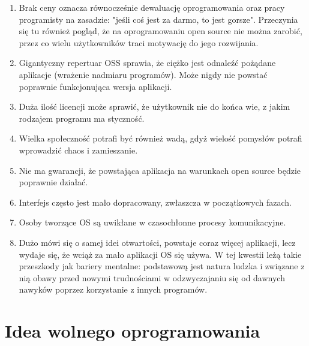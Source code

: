\documentclass{article}
\begin{document}
\begin{enumerate}
    \item Brak ceny oznacza równocześnie dewaluację oprogramowania oraz pracy programisty na zasadzie: "jeśli coś jest za darmo, to jest gorsze". Przeczynia się tu również pogląd, że na oprogramowaniu open source nie można zarobić, przez co wielu użytkowników traci motywację do jego rozwijania\cite{Kotula}.
    
    \item Gigantyczny repertuar OSS sprawia, że ciężko jest odnaleźć pożądane aplikacje (wrażenie nadmiaru programów). Może nigdy nie powstać poprawnie funkcjonująca wersja aplikacji\cite{Kotula}.
    
    \item Duża ilość licencji może sprawić, że użytkownik nie do końca wie, z jakim rodzajem programu ma styczność\cite{Kotula}.
    
    \item Wielka społeczność potrafi być również wadą, gdyż wielość pomysłów potrafi wprowadzić chaos i zamieszanie\cite{Kotula}.
    
    \item Nie ma gwarancji, że powstająca aplikacja na warunkach open source będzie poprawnie działać\cite{Kotula}.
    
    \item Interfejs często jest mało dopracowany, zwłaszcza w początkowych fazach\cite{Kotula}.
    
    \item Osoby tworzące OS są uwikłane w czasochłonne procesy komunikacyjne\cite{Kotula}.
    
    \item Dużo mówi się o samej idei otwartości, powstaje coraz więcej aplikacji, lecz wydaje się, że wciąż za mało aplikacji OS się używa. W tej kwestii leżą takie przeszkody jak bariery mentalne: podstawową jest natura ludzka i związane z nią obawy przed nowymi trudnościami w odzwyczajaniu się od dawnych nawyków poprzez korzystanie z innych programów\cite{Kotula}.
\end{enumerate}

\section{Idea wolnego oprogramowania}
\end{document}

